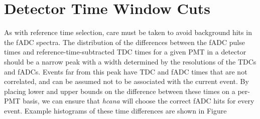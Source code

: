 \section{Detector Time Window Cuts}
As with reference time selection, care must be taken to avoid background hits
in the fADC spectra.
The distribution of the differences between the fADC pulse times and
reference-time-subtracted TDC times for a given PMT in a detector should
be a narrow peak with a width determined by the resolutions of the TDCs
and fADCs.
Events far from this peak have TDC and fADC times that are not correlated, and
can be assumed not to be associated with the current event.
By placing lower and upper bounds on the difference between these times on a
per-PMT basis, we can ensure that \textit{hcana} will choose the correct fADC
hits for every event.
Example histograms of these time differences are shown in Figure
